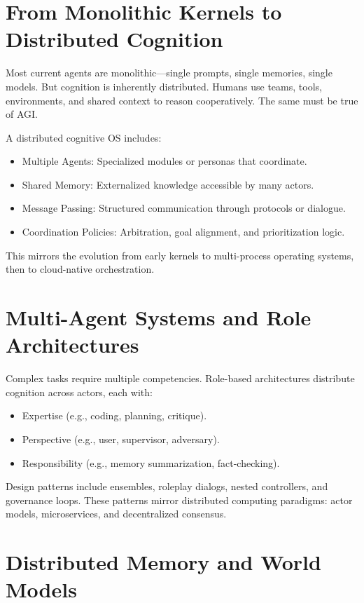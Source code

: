 \documentclass{book}
\begin{document}
\section{From Monolithic Kernels to Distributed Cognition}

Most current agents are monolithic—single prompts, single memories, single models. But cognition is inherently distributed. Humans use teams, tools, environments, and shared context to reason cooperatively. The same must be true of AGI.

A distributed cognitive OS includes:

\begin{itemize}
  \item Multiple Agents: Specialized modules or personas that coordinate.
  \item Shared Memory: Externalized knowledge accessible by many actors.
  \item Message Passing: Structured communication through protocols or dialogue.
  \item Coordination Policies: Arbitration, goal alignment, and prioritization logic.
\end{itemize}

This mirrors the evolution from early kernels to multi-process operating systems, then to cloud-native orchestration.

\section{Multi-Agent Systems and Role Architectures}

Complex tasks require multiple competencies. Role-based architectures distribute cognition across actors, each with:

\begin{itemize}
  \item Expertise (e.g., coding, planning, critique).
  \item Perspective (e.g., user, supervisor, adversary).
  \item Responsibility (e.g., memory summarization, fact-checking).
\end{itemize}

Design patterns include ensembles, roleplay dialogs, nested controllers, and governance loops. These patterns mirror distributed computing paradigms: actor models, microservices, and decentralized consensus.

\section{Distributed Memory and World Models}
\end{document}

